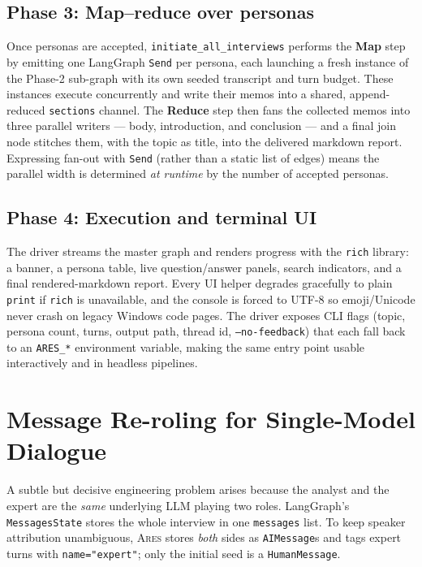 \documentclass[10pt,twocolumn]{article}
\newcommand{\ares}{\textsc{Ares}}
\newcommand{\code}[1]{\texttt{\small #1}}
\begin{document}
\subsection{Phase 3: Map--reduce over personas}
\label{sec:phase3}
Once personas are accepted, \code{initiate\_all\_interviews} performs the
\textbf{Map} step by emitting one LangGraph \code{Send} per persona, each
launching a fresh instance of the Phase-2 sub-graph with its own seeded
transcript and turn budget. These instances execute concurrently and write their
memos into a shared, append-reduced \code{sections} channel. The \textbf{Reduce}
step then fans the collected memos into three parallel writers --- body,
introduction, and conclusion --- and a final join node stitches them, with the
topic as title, into the delivered markdown report. Expressing fan-out with
\code{Send} (rather than a static list of edges) means the parallel width is
determined \emph{at runtime} by the number of accepted personas.

\subsection{Phase 4: Execution and terminal UI}
The driver streams the master graph and renders progress with the \code{rich}
library: a banner, a persona table, live question/answer panels, search
indicators, and a final rendered-markdown report. Every UI helper degrades
gracefully to plain \code{print} if \code{rich} is unavailable, and the console
is forced to UTF-8 so emoji/Unicode never crash on legacy Windows code pages. The
driver exposes CLI flags (topic, persona count, turns, output path, thread id,
\code{--no-feedback}) that each fall back to an \code{ARES\_*} environment
variable, making the same entry point usable interactively and in headless
pipelines.

\section{Message Re-roling for Single-Model Dialogue}
\label{sec:reroling}

A subtle but decisive engineering problem arises because the analyst and the
expert are the \emph{same} underlying LLM playing two roles. LangGraph's
\code{MessagesState} stores the whole interview in one \code{messages} list. To
keep speaker attribution unambiguous, \ares{} stores \emph{both} sides as
\code{AIMessage}s and tags expert turns with \code{name="expert"}; only the
initial seed is a \code{HumanMessage}.
\end{document}
